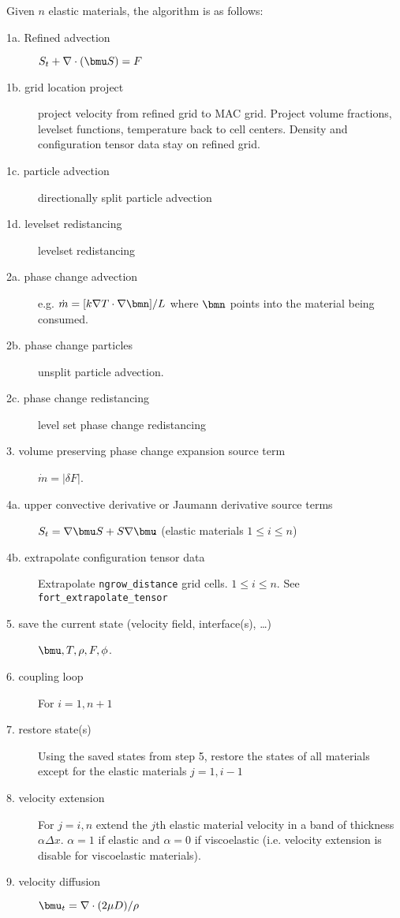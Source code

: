 \documentclass{beamer}
\begin{document}
Given $n$ elastic materials, the algorithm is as follows:
\begin{description}
\item[1a. Refined advection] $S_{t}+\nabla\cdot(\bmu S)=F$
\item[1b. grid location project ] project velocity from refined grid
  to MAC grid.  Project volume fractions, levelset functions,
  temperature back to cell centers. Density and configuration tensor
  data stay on refined grid.
\item[1c. particle advection] directionally split particle advection
\item[1d. levelset redistancing] levelset redistancing
\item[2a. phase change advection] e.g. 
  $\dot{m}=[k\nabla T\cdot\nabla\bmn]/L$ where $\bmn$ points into the 
  material being consumed.
\item[2b. phase change particles] unsplit particle advection.
\item[2c. phase change redistancing] level set phase change redistancing
\item[3. volume preserving  phase change expansion source term] 
  $\dot{m}=|\delta F|$.
\item[4a. upper convective derivative or Jaumann derivative source terms]
  $S_{t}=\nabla\bmu S+S\nabla\bmu$ (elastic materials $1\le i\le n$)
\item[4b. extrapolate configuration tensor data] Extrapolate 
 \verb=ngrow_distance=
 grid cells.  $1\le i\le n$.  See \verb=fort_extrapolate_tensor=
\item[5. save the current state (velocity field, interface(s), \ldots)]
  $\bmu,T,\rho,F,\phi$.
\item[6. coupling loop] For $i=1,n+1$
\item[7. restore state(s)] Using the saved states from step 5, restore
  the states of all materials except for the elastic materials $j=1,i-1$
\item[8. velocity extension] For $j=i,n$ extend the $j$th elastic material
 velocity in a band of thickness $\alpha \Delta x$.  $\alpha=1$ if elastic
 and $\alpha=0$ if viscoelastic (i.e. velocity extension is disable for 
 viscoelastic materials).
\item[9. velocity diffusion] $\bmu_{t}=\nabla\cdot(2\mu D)/\rho$

\end{description}
\end{document}
